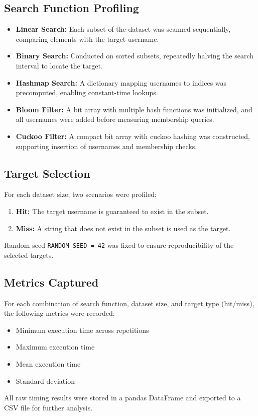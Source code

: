 \documentclass[acmsmall,screen, nonacm]{acmart}
\begin{document}
\subsection{Search Function Profiling}
\begin{itemize}
	\item \textbf{Linear Search:} Each subset of the dataset was scanned sequentially, comparing elements with the target username.
	\item \textbf{Binary Search:} Conducted on sorted subsets, repeatedly halving the search interval to locate the target.
	\item \textbf{Hashmap Search:} A dictionary mapping usernames to indices was precomputed, enabling constant-time lookups.
	\item \textbf{Bloom Filter:} A bit array with multiple hash functions was initialized, and all usernames were added before measuring membership queries.
	\item \textbf{Cuckoo Filter:} A compact bit array with cuckoo hashing was constructed, supporting insertion of usernames and membership checks.
\end{itemize}

\subsection{Target Selection}
For each dataset size, two scenarios were profiled:
\begin{enumerate}
	\item \textbf{Hit:} The target username is guaranteed to exist in the subset.
	\item \textbf{Miss:} A string that does not exist in the subset is used as the target.
\end{enumerate}
Random seed \texttt{RANDOM\_SEED = 42} was fixed to ensure reproducibility of the selected targets.

\subsection{Metrics Captured}
For each combination of search function, dataset size, and target type (hit/miss), the following metrics were recorded:
\begin{itemize}
	\item Minimum execution time across repetitions
	\item Maximum execution time
	\item Mean execution time
	\item Standard deviation
\end{itemize}
All raw timing results were stored in a pandas DataFrame and exported to a CSV file for further analysis.
\end{document}
